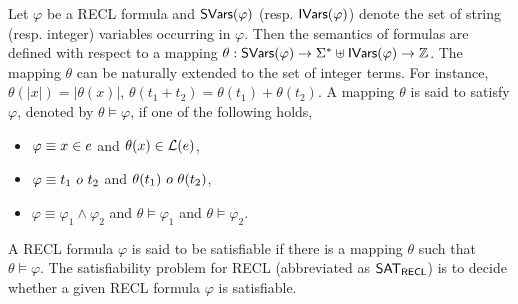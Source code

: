 Let $\varphi$ be a RECL formula and ${\sf SVars}(\varphi)$ (resp. ${\sf IVars}(\varphi)$) denote the set of string (resp. integer) variables occurring in $\varphi$. 
%
Then the semantics of formulas are defined with respect to a mapping $\theta: {\sf SVars}(\varphi) \rightarrow \Sigma^* \uplus {\sf IVars}(\varphi) \rightarrow \mathbb{Z}$. 
The mapping $\theta$ can be naturally extended to the set of integer terms. For instance, $\theta(|x|) =|\theta(x)|$, $\theta(t_1 + t_2) = \theta(t_1) + \theta(t_2)$. 
A  mapping $\theta$ is said to satisfy $\varphi$, denoted by $\theta \models \varphi$, if one of the following holds,  
\begin{itemize}
\item $\varphi \equiv x \in e$ and $\theta(x) \in \mathcal{L}(e)$, 
%
%
\item $\varphi \equiv t_1\ o\ t_2$ and $\theta(t_1)\ \op\ \theta(t_2)$, 
%
\item $\varphi \equiv \varphi_1 \wedge \varphi_2$ and $\theta \models \varphi_1$ and $\theta \models \varphi_2$.
\end{itemize}
A RECL formula $\varphi$ is said to be satisfiable if there is a mapping $\theta$ such that $\theta \models \varphi$. The satisfiability problem for RECL (abbreviated as ${\sf SAT_{RECL}}$) is to decide whether a given RECL formula $\varphi$ is satisfiable. 


